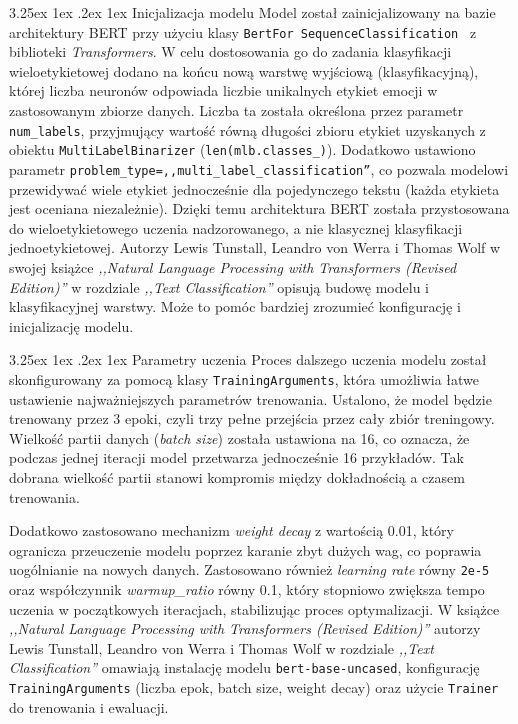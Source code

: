 \documentclass[wmii, inf, mgr]{uwmthesis}
\makeatletter
\renewcommand\paragraph{\@startsection{paragraph}{4}{\z@}%
  {3.25ex \@plus1ex \@minus.2ex}%
  {1ex}%
  {\normalfont\normalsize\bfseries}}
\makeatother
\begin{document}
\paragraph{Inicjalizacja modelu}
Model został zainicjalizowany na bazie architektury BERT przy użyciu klasy \texttt{BertFor SequenceClassification~} z biblioteki \textit{Transformers}. W celu dostosowania go do zadania klasyfikacji wieloetykietowej dodano na końcu nową warstwę wyjściową (klasyfikacyjną), której liczba neuronów odpowiada liczbie unikalnych etykiet emocji w zastosowanym zbiorze danych. Liczba ta została określona przez parametr \texttt{num\_labels}, przyjmujący wartość równą długości zbioru etykiet 
uzyskanych z obiektu \texttt{MultiLabelBinarizer} (\texttt{len(mlb.classes\_)}). Dodatkowo ustawiono parametr \texttt{problem\_type=,,multi\_label\_classification''}, co pozwala modelowi przewidywać wiele etykiet jednocześnie dla pojedynczego tekstu (każda etykieta jest oceniana niezależnie). Dzięki temu architektura BERT została przystosowana do wieloetykietowego uczenia nadzorowanego, a nie klasycznej klasyfikacji jednoetykietowej. Autorzy Lewis Tunstall, Leandro von Werra i Thomas Wolf w swojej książce \textit{,,Natural Language Processing with Transformers (Revised Edition)''} \cite{NaturalLanguageProcessing} w rozdziale \textit{,,Text Classification''} opisują budowę modelu i~ klasyfikacyjnej warstwy. Może to pomóc bardziej zrozumieć konfigurację i inicjalizację modelu.

\paragraph{Parametry uczenia}
Proces dalszego uczenia modelu został skonfigurowany za pomocą klasy 
\texttt{TrainingArguments}, która umożliwia łatwe ustawienie najważniejszych parametrów trenowania. Ustalono, że model będzie trenowany przez 3 epoki, czyli trzy pełne przejścia przez cały zbiór treningowy. Wielkość partii danych (\textit{batch size}) została ustawiona na 16, co oznacza, że podczas jednej iteracji model przetwarza jednocześnie 16 przykładów. Tak dobrana wielkość partii stanowi kompromis między dokładnością a czasem trenowania. 

Dodatkowo zastosowano mechanizm \textit{weight decay} z wartością 0.01, który ogranicza przeuczenie modelu poprzez karanie zbyt dużych wag, co poprawia uogólnianie na nowych danych. Zastosowano również \textit{learning rate} równy \texttt{2e-5} oraz współczynnik \textit{warmup\_ratio} równy 0.1, który stopniowo zwiększa tempo uczenia w początkowych iteracjach, stabilizując proces optymalizacji. W książce \textit{,,Natural Language Processing with Transformers (Revised Edition)''} \cite{NaturalLanguageProcessing} autorzy Lewis Tunstall, Leandro von Werra i Thomas Wolf w rozdziale \textit{,,Text Classification''} omawiają instalację modelu \texttt{bert-base-uncased}, konfigurację \texttt{TrainingArguments} (liczba epok, batch size, weight decay) oraz użycie \texttt{Trainer} do trenowania i ewaluacji.
\end{document}
